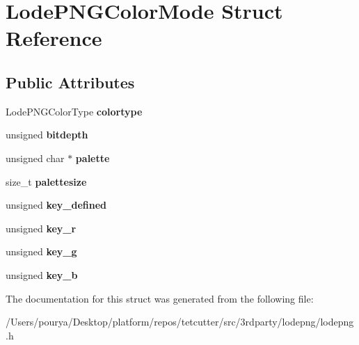 \hypertarget{structLodePNGColorMode}{}\section{Lode\+P\+N\+G\+Color\+Mode Struct Reference}
\label{structLodePNGColorMode}
\subsection*{Public Attributes}
\begin{DoxyCompactItemize}
\item 
\hypertarget{structLodePNGColorMode_a4f3df7240411abe80546052d197fbe8d}{}Lode\+P\+N\+G\+Color\+Type {\bfseries colortype}\label{structLodePNGColorMode_a4f3df7240411abe80546052d197fbe8d}

\item 
\hypertarget{structLodePNGColorMode_ad20010b9561980f65281bc17f7848253}{}unsigned {\bfseries bitdepth}\label{structLodePNGColorMode_ad20010b9561980f65281bc17f7848253}

\item 
\hypertarget{structLodePNGColorMode_a54f0a793238009fcb95f081626fae308}{}unsigned char $\ast$ {\bfseries palette}\label{structLodePNGColorMode_a54f0a793238009fcb95f081626fae308}

\item 
\hypertarget{structLodePNGColorMode_a407557f056168682d9319aeb60866dcc}{}size\+\_\+t {\bfseries palettesize}\label{structLodePNGColorMode_a407557f056168682d9319aeb60866dcc}

\item 
\hypertarget{structLodePNGColorMode_ab9105505c5d56cfc6ce4efe1bb288b54}{}unsigned {\bfseries key\+\_\+defined}\label{structLodePNGColorMode_ab9105505c5d56cfc6ce4efe1bb288b54}

\item 
\hypertarget{structLodePNGColorMode_a29e64327bca1f3d16235e9ff471e4d50}{}unsigned {\bfseries key\+\_\+r}\label{structLodePNGColorMode_a29e64327bca1f3d16235e9ff471e4d50}

\item 
\hypertarget{structLodePNGColorMode_ad98309f36d289392b0c440baa50af9f6}{}unsigned {\bfseries key\+\_\+g}\label{structLodePNGColorMode_ad98309f36d289392b0c440baa50af9f6}

\item 
\hypertarget{structLodePNGColorMode_a93a269405fee0d1c5045a1a671ed1de8}{}unsigned {\bfseries key\+\_\+b}\label{structLodePNGColorMode_a93a269405fee0d1c5045a1a671ed1de8}

\end{DoxyCompactItemize}


The documentation for this struct was generated from the following file\+:\begin{DoxyCompactItemize}
\item 
/\+Users/pourya/\+Desktop/platform/repos/tetcutter/src/3rdparty/lodepng/lodepng.\+h\end{DoxyCompactItemize}
